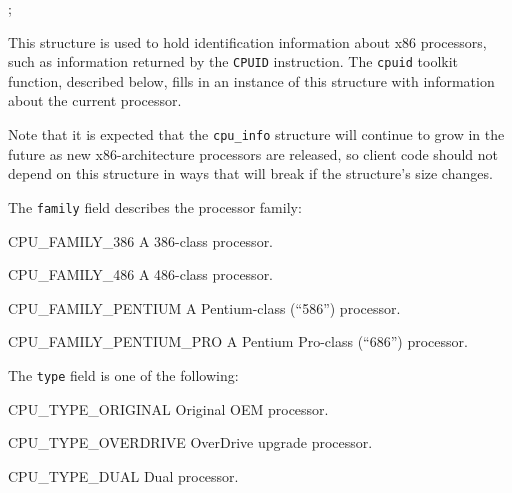 \label{cpu-info}
\begin{apisyn}

	;
\end{apisyn}
\begin{apidesc}
	This structure is used to hold identification information
	about x86 processors,
	such as information returned by the {\tt CPUID} instruction.
	The {\tt cpuid} toolkit function, described below,
	fills in an instance of this structure
	with information about the current processor.

	Note that it is expected that the {\tt cpu_info} structure
	will continue to grow in the future
	as new x86-architecture processors are released,
	so client code should not depend on this structure
	in ways that will break if the structure's size changes.

	The {\tt family} field describes the processor family:
	\begin{icsymlist}
	\item[CPU_FAMILY_386]
		A 386-class processor.
	\item[CPU_FAMILY_486]
		A 486-class processor.
	\item[CPU_FAMILY_PENTIUM]
		A Pentium-class (``586'') processor.
	\item[CPU_FAMILY_PENTIUM_PRO]
		A Pentium Pro-class (``686'') processor.
	\end{icsymlist}

	The {\tt type} field is one of the following:
	\begin{icsymlist}
	\item[CPU_TYPE_ORIGINAL]
		Original OEM processor.
	\item[CPU_TYPE_OVERDRIVE]
		OverDrive upgrade processor.
	\item[CPU_TYPE_DUAL]
		Dual processor.
	\end{icsymlist}


\end{apidesc}
